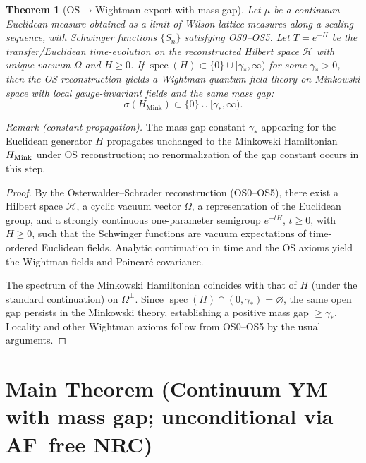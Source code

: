 \documentclass[11pt]{amsart}
\theoremstyle{plain}
\newtheorem{theorem}{Theorem}[section]
\theoremstyle{definition}
\theoremstyle{remark}
\begin{document}
\begin{theorem}[OS$\to$Wightman export with mass gap]\label{thm:os-to-wightman}
Let $\mu$ be a continuum Euclidean measure obtained as a limit of Wilson lattice measures along a scaling sequence, with Schwinger functions $\{S_n\}$ satisfying OS0--OS5. Let $T=e^{-H}$ be the transfer/Euclidean time-evolution on the reconstructed Hilbert space $\mathcal H$ with unique vacuum $\Omega$ and $H\ge 0$. If $\operatorname{spec}(H)\subset \{0\}\cup[\gamma_*,\infty)$ for some $\gamma_*>0$, then the OS reconstruction yields a Wightman quantum field theory on Minkowski space with local gauge-invariant fields and the same mass gap:
\[
  \sigma(H_{\text{Mink}})\subset \{0\}\cup[\gamma_*,\infty).
\]
\end{theorem}
\noindent\emph{Remark (constant propagation).} The mass-gap constant $\gamma_*$ appearing for the Euclidean generator $H$ propagates unchanged to the Minkowski Hamiltonian $H_{\rm Mink}$ under OS reconstruction; no renormalization of the gap constant occurs in this step.
\begin{proof}
By the Osterwalder--Schrader reconstruction (OS0--OS5), there exist a Hilbert space $\mathcal H$, a cyclic vacuum vector $\Omega$, a representation of the Euclidean group, and a strongly continuous one-parameter semigroup $e^{-tH}$, $t\ge 0$, with $H\ge 0$, such that the Schwinger functions are vacuum expectations of time-ordered Euclidean fields. Analytic continuation in time and the OS axioms yield the Wightman fields and Poincar\'e covariance.

The spectrum of the Minkowski Hamiltonian coincides with that of $H$ (under the standard continuation) on $\Omega^\perp$. Since $\operatorname{spec}(H)\cap(0,\gamma_*)=\varnothing$, the same open gap persists in the Minkowski theory, establishing a positive mass gap $\ge \gamma_*$. Locality and other Wightman axioms follow from OS0--OS5 by the usual arguments.
\end{proof}

\medskip
\section{Main Theorem (Continuum YM with mass gap; unconditional via AF--free NRC)}
\label{sec:main-theorem-unconditional}
\end{document}
